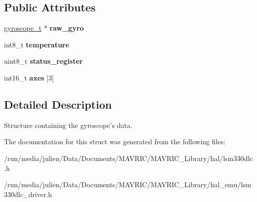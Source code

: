\subsection*{Public Attributes}
\begin{DoxyCompactItemize}
\item 
\hypertarget{structlsm__gyro__t_a35d96be3e3127d6909e257d1f87a06a2}{\hyperlink{structgyroscope__t}{gyroscope\+\_\+t} $\ast$ {\bfseries raw\+\_\+gyro}}\label{structlsm__gyro__t_a35d96be3e3127d6909e257d1f87a06a2}

\item 
\hypertarget{structlsm__gyro__t_ac4c1d0b05e5a5ff85b7c9665554d606c}{int8\+\_\+t {\bfseries temperature}}\label{structlsm__gyro__t_ac4c1d0b05e5a5ff85b7c9665554d606c}

\item 
\hypertarget{structlsm__gyro__t_aab7b86f6cad2c995b403d79059e8eb82}{uint8\+\_\+t {\bfseries status\+\_\+register}}\label{structlsm__gyro__t_aab7b86f6cad2c995b403d79059e8eb82}

\item 
\hypertarget{structlsm__gyro__t_a70ee7598477f3ef515f6c2a7f251b0f0}{int16\+\_\+t {\bfseries axes} \mbox{[}3\mbox{]}}\label{structlsm__gyro__t_a70ee7598477f3ef515f6c2a7f251b0f0}

\end{DoxyCompactItemize}


\subsection{Detailed Description}
Structure containing the gyroscope's data. 

The documentation for this struct was generated from the following files\+:\begin{DoxyCompactItemize}
\item 
/run/media/julien/\+Data/\+Documents/\+M\+A\+V\+R\+I\+C/\+M\+A\+V\+R\+I\+C\+\_\+\+Library/hal/lsm330dlc.\+h\item 
/run/media/julien/\+Data/\+Documents/\+M\+A\+V\+R\+I\+C/\+M\+A\+V\+R\+I\+C\+\_\+\+Library/hal\+\_\+emu/lsm330dlc\+\_\+driver.\+h\end{DoxyCompactItemize}
